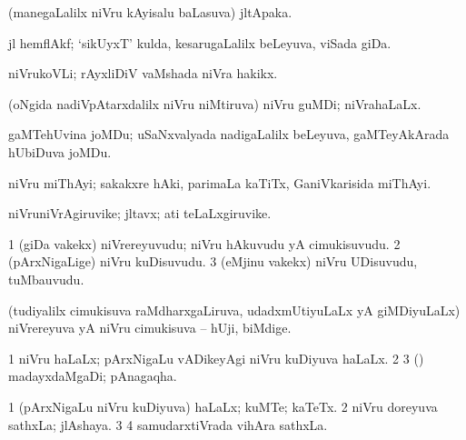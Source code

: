 {\bentry
{} 
\gl{\nA}
\expl{}
\bmng
(manegaLalilx niVru kAyisalu baLasuva) jltApaka. 
\emng
\eentry

\bentry
{} 
\gl{\nA}
\expl{}
\bmng
jl hemflAkf; `sikUyxT' kulda, kesarugaLalilx beLeyuva, viSada giDa. 
\emng
\eentry

\bentry
{} 
\gl{\nA}
\expl{}
\bmng
niVrukoVLi; rAyxliDiV vaMshada niVra hakikx. 
\emng
\eentry

\bentry
{} 
\gl{\nA}
\bmng
{} 
\emng
\eentry

\bentry
{} 
\gl{\nA}
\bmng
(oNgida nadiVpAtarxdalilx niVru niMtiruva) niVru guMDi; niVrahaLaLx. 
\emng
\eentry

\bentry
{} 
\gl{\nA}
\expl{}
\bmng
gaMTehUvina joMDu; uSaNxvalyada nadigaLalilx beLeyuva, gaMTeyAkArada hUbiDuva joMDu. 
\emng
\eentry

\bentry
{} 
\gl{\nA}
\expl{}
\bmng
niVru miThAyi; sakakxre hAki, parimaLa kaTiTx, GaniVkarisida miThAyi. 
\emng
\eentry

\bentry
{} 
\gl{\nA}
\expl{}
\bmng
niVruniVrAgiruvike; jltavx; ati teLaLxgiruvike. 
\emng
\eentry

\bentry
{} 
\gl{\nA}
\expl{}
\bmng
\bnum
\num{1} (giDa \mo vakekx) niVrereyuvudu; niVru hAkuvudu yA cimukisuvudu. 
\num{2} (pArxNigaLige) niVru kuDisuvudu. 
\num{3} (eMjinu \mo vakekx) niVru UDisuvudu, tuMbauvudu. 
\enum
\emng
\eentry

\bentry
{} 
\gl{\nA}
\expl{}
\bmng
(tudiyalilx cimukisuva raMdharxgaLiruva, udadxmUtiyuLaLx yA giMDiyuLaLx) niVrereyuva yA niVru cimukisuva -- hUji, biMdige. 
\emng
\eentry

\bentry
{} 
\gl{\nA}
\expl{}
\bmng
{} 
\emng
\eentry

\bentry
{} 
\gl{\nA}
\expl{}
\bmng
\bnum
\num{1} niVru haLaLx; pArxNigaLu vADikeyAgi niVru kuDiyuva haLaLx. 
\num{2}  
\num{3} (\ashi) madayxdaMgaDi; pAnagaqha. 
\enum
\emng
\eentry

\bentry
{} 
\gl{\nA}
\expl{}
\bmng
\bnum
\num{1} (pArxNigaLu niVru kuDiyuva) haLaLx; kuMTe; kaTeTx. 
\num{2} niVru doreyuva sathxLa; jlAshaya. 
\num{3}  
\num{4} samudarxtiVrada vihAra sathxLa. 
\enum
\emng
\eentry

}
